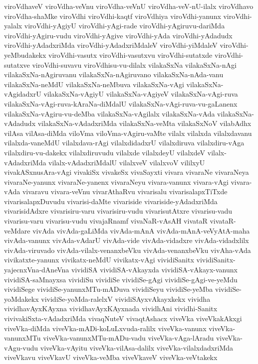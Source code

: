 {viroVdhaveV
viroVdha-veVnu
viroVdha-veVnU
viroVdha-veV-nU-ilalx
viroVdhavo
viroVdha-shaMke
viroVdhi
viroVdhi-kaqtf
viroVdhiya
viroVdhi-yanunx
viroVdhi-yalalx
viroVdhi-yAgiyU
viroVdhi-yAgi-rade
viroVdhi-yAgiruvu-dariMda
viroVdhi-yAgiru-vudu
viroVdhi-yAgive
viroVdhi-yAda
viroVdhi-yAdadudx
viroVdhi-yAdadxriMda
viroVdhi-yAdadxriMdaleV
viroVdhi-yiMdaleV
viroVdhi-yeMbudakekx
viroVdhi-vasutx
viroVdhi-vasutxvu
viroVdhi-sutatxde
viroVdhi-sutatxve
viroVdhi-suvavu
viroVdhisu-vu-dilalx
vilakaSxNa
vilakaSxNa-nAgi
vilakaSxNa-nAgiruvanu
vilakaSxNa-nAgiruvano
vilakaSxNa-nAda-vanu
vilakaSxNa-neMdU
vilakaSxNa-neMbuva
vilakaSxNa-vAgi
vilakaSxNa-vAgidadxrU
vilakaSxNa-vAgiyU
vilakaSxNa-vAgiyeV
vilakaSxNa-vAgi-ruva
vilakaSxNa-vAgi-ruva-kAraNa-diMdalU
vilakaSxNa-vAgi-ruva-vu-gaLanenx
vilakaSxNa-vAgiru-vu-deMba
vilakaSxNa-vAgilalx
vilakaSxNa-vAda
vilakaSxNa-vAdadudx
vilakaSxNa-vAdadxriMda
vilakaSxNa-veMta
vilakaSxNoV
vilabAdhx
vilAsa
vilAsa-diMda
viloVma
viloVma-vAgiru-vaMte
vilalx
vilalxda
vilalxdavanu
vilalxda-vaneMdU
vilalxdava-rAgi
vilalxdidadxrU
vilalxdiruva
vilalxdiru-vAga
vilalxdiru-vu-dakekx
vilalxdiruvudu
vilalxde
vilalxdeyU
vilalxdeV
vilalx-vAdadxriMda
vilalx-vAdadxriMdalU
vilalxveV
vilalxvoV
vililxyU
vivakASxnusAra-vAgi
vivakiSx
vivakeSx
vivaSayxti
vivara
vivaraNe
vivaraNeya
vivaraNe-yanunx
vivaraNe-yanenx
vivaraNeyu
vivara-vanunx
vivara-vAgi
vivara-vAda
vivaravu
vivara-veVnu
vivarAthaRvu
vivarisalu
vivarisalapxTiTxde
vivarisalapxDuvudu
vivarisi-daMte
vivariside
vivariside-yAdadxriMda
vivarisidAdxre
vivarisiru-varu
vivarisiru-vudu
vivarisutAtxre
vivarisu-vadu
vivarisu-varu
vivarisu-vudu
vivajaRnamf
vivaNaR-vAsAH
vivataR
vivataR-veMdare
vivAda
vivAda-gaLiMda
vivAda-mAnA
vivAda-mAnA-veVyAtA-maha
vivAda-vanunx
vivAda-vAdarU
vivAda-vide
vivAda-vidadxre
vivAda-vidadxlilx
vivAda-viruvado
vivAda-vilalx-venanxbeVku
vivAda-venanxbeVku
vivAha-vAda
vivikatxte-yanunx
vivikatx-neMdU
vivikatx-vAgi
vividiSanitx
vividiSanitx-yajecnxVna-dAneVna
vividiSA
vividiSA-vAkayxda
vividiSA-vAkayx-vanunx
vividiSA-saMnayxsa
vividiSu
vividiSe
vividiSe-gAgi
vividiSe-gAgi-ve-yeMdu
vividiSege
vividiSe-yanunxMTu-mADuva
vividiSeyu
vividiSe-yeMba
vividiSe-yoMdakekx
vividiSe-yoMda-ralelxV
vividiSAyxvAkayxkekx
vividha
vividhavAyxKAyxna
vividhavAyxKAyxnada
vividhAni
vividhi-Sanitx
vivivakiSxta-vAdadxriMda
vivaqNuteV
vivaqtAshacx
viveVka
viveVkakAkxgi
viveVka-diMda
viveVka-mADi-koLuLxvuda-ralilx
viveVka-vanunx
viveVka-vanunxMTu
viveVka-vanunxMTu-mADu-vadu
viveVka-vAga-lAradu
viveVka-vAgu-vudu
viveVka-vAyitu
viveVka-vilAsa-dalilx
viveVka-vilalxdadxriMda
viveVkavu
viveVkavU
viveVka-veMba
viveVkaveV
viveVka-veVtakekx
}
